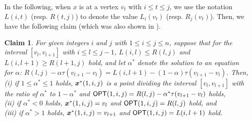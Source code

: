\documentclass[a4paper]{llncs}
\newcommand{\bm}[1]{\mbox{\boldmath{$#1$}}}
\newtheorem{clm}{Claim}
\begin{document}
In the following, when $x$ is at a vertex $v_t$ with $i \le t \le j$,
we use the notation $L(i, t)$ (resp. $R(t, j)$) to denote the value $L_i(v_t)$ (resp. $R_j(v_t)$).
Then, we have the following claim (which was also shown in \cite{chknsx13,hacgknsx14,hgk14_2}).
\begin{clm}
For given integers $i$ and $j$ with $1 \le i \le j \le n$, 
suppose that for the interval $[v_l, v_{l+1}]$ with $i \le l \le j-1$, $L(i, l) \le R(l, j)$ and $L(i, l+1) \ge R(l+1, j)$ hold,
and let $\alpha^*$ denote the solution to an equation for $\alpha$: $R(l, j) - \alpha\tau(v_{l+1} - v_l) = L(i, l+1) - (1 - \alpha)\tau(v_{l+1} - v_l)$.
Then, \\
{\rm (i)} if $1 \le \alpha^* \le 1$ holds, ${\bm x}^*(1, i, j)$ is a point dividing the interval $[v_l, v_{l+1}]$ with the ratio of $\alpha^*$ to $1-\alpha^*$ 
and ${\sf OPT}(1, i, j) = R(l, j) - \alpha^*\tau(v_{l+1} - v_l)$ holds, \\
{\rm (ii)} if $\alpha^* < 0$ holds, ${\bm x}^*(1, i, j) = v_l$ and ${\sf OPT}(1, i, j) = R(l, j)$ hold, and \\
{\rm (iii)} if $\alpha^* > 1$ holds, ${\bm x}^*(1, i, j) = v_{l+1}$ and ${\sf OPT}(1, i, j) = L(i, l+1)$ hold. \\
\label{clm2.1}
\end{clm}
\end{document}
